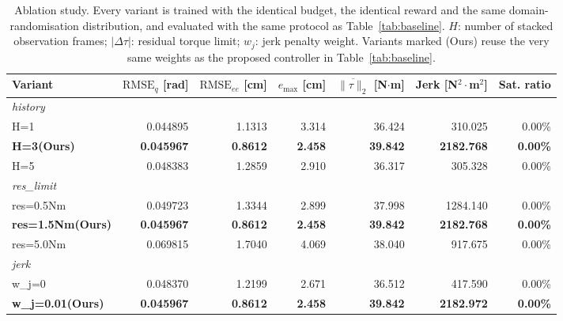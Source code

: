 \begin{table}[t]
  \centering
  \caption{Ablation study. Every variant is trained with the identical budget, the identical reward and the same domain-randomisation distribution, and evaluated with the same protocol as Table~\ref{tab:baseline}. $H$: number of stacked observation frames; $|\Delta\tau|$: residual torque limit; $w_j$: jerk penalty weight. Variants marked (Ours) reuse the very same weights as the proposed controller in Table~\ref{tab:baseline}.}
  \label{tab:ablation}
  \begin{tabular}{lrrrrrr}
    \toprule
    Variant & $\mathrm{RMSE}_q$ [rad] & $\mathrm{RMSE}_{ee}$ [cm] & $e_{\max}$ [cm] & $\overline{\|\tau\|_2}$ [N$\cdot$m] & Jerk [N$^2\cdot$m$^2$] & Sat. ratio \\
    \midrule
    \multicolumn{7}{l}{\textit{history}} \\
    H=1 & 0.044895 & 1.1313 & 3.314 & 36.424 & 310.025 & 0.00\% \\
    \textbf{H=3(Ours)} & \textbf{0.045967} & \textbf{0.8612} & \textbf{2.458} & \textbf{39.842} & \textbf{2182.768} & \textbf{0.00\%} \\
    H=5 & 0.048383 & 1.2859 & 2.910 & 36.317 & 305.328 & 0.00\% \\
    \multicolumn{7}{l}{\textit{res_limit}} \\
    res=0.5Nm & 0.049723 & 1.3344 & 2.899 & 37.998 & 1284.140 & 0.00\% \\
    \textbf{res=1.5Nm(Ours)} & \textbf{0.045967} & \textbf{0.8612} & \textbf{2.458} & \textbf{39.842} & \textbf{2182.768} & \textbf{0.00\%} \\
    res=5.0Nm & 0.069815 & 1.7040 & 4.069 & 38.040 & 917.675 & 0.00\% \\
    \multicolumn{7}{l}{\textit{jerk}} \\
    w_j=0 & 0.048370 & 1.2199 & 2.671 & 36.512 & 417.590 & 0.00\% \\
    \textbf{w_j=0.01(Ours)} & \textbf{0.045967} & \textbf{0.8612} & \textbf{2.458} & \textbf{39.842} & \textbf{2182.972} & \textbf{0.00\%} \\
    \bottomrule
  \end{tabular}
\end{table}
